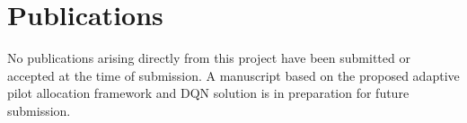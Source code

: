 \chapter*{Publications}

No publications arising directly from this project have been submitted or accepted at the time of submission. A manuscript based on the proposed adaptive pilot allocation framework and DQN solution is in preparation for future submission.
